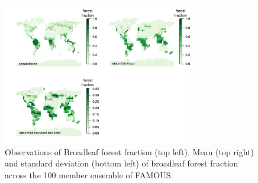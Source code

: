 \documentclass[esd, article]{copernicus} %
\begin{document}














\begin{figure}[t]
\includegraphics[width=8.3cm]{graphics/BL_obs_ensemble_mean_sd.pdf}
\caption{Observations of Broadleaf forest fraction (top left). Mean (top right) and standard deviation (bottom left) of broadleaf forest fraction across the 100 member ensemble of FAMOUS.}
\label{fig:BL_obs_ensemble_mean_sd}
\end{figure}
\end{document}
